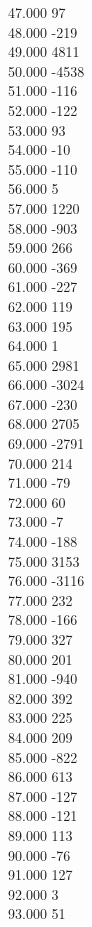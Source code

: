 { 47.000	97 \\
 48.000	-219 \\
 49.000	4811 \\
 50.000	-4538 \\
 51.000	-116 \\
 52.000	-122 \\
 53.000	93 \\
 54.000	-10 \\
 55.000	-110 \\
 56.000	5 \\
 57.000	1220 \\
 58.000	-903 \\
 59.000	266 \\
 60.000	-369 \\
 61.000	-227 \\
 62.000	119 \\
 63.000	195 \\
 64.000	1 \\
 65.000	2981 \\
 66.000	-3024 \\
 67.000	-230 \\
 68.000	2705 \\
 69.000	-2791 \\
 70.000	214 \\
 71.000	-79 \\
 72.000	60 \\
 73.000	-7 \\
 74.000	-188 \\
 75.000	3153 \\
 76.000	-3116 \\
 77.000	232 \\
 78.000	-166 \\
 79.000	327 \\
 80.000	201 \\
 81.000	-940 \\
 82.000	392 \\
 83.000	225 \\
 84.000	209 \\
 85.000	-822 \\
 86.000	613 \\
 87.000	-127 \\
 88.000	-121 \\
 89.000	113 \\
 90.000	-76 \\
 91.000	127 \\
 92.000	3 \\
 93.000	51 \\
}
